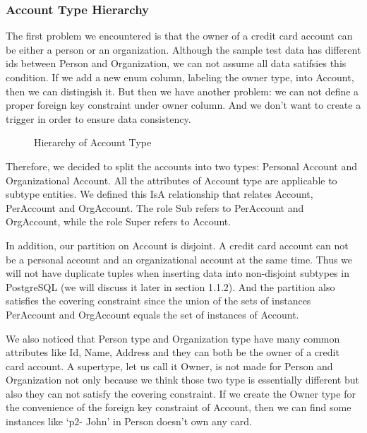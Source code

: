 \documentclass[11pt]{article}
\begin{document}
\subsubsection{Account Type Hierarchy}

\par
The first problem we encountered is that the owner of a credit card account can be either a person or an organization. Although the sample test data has different ids between Person and Organization, we can not assume all data satifsies this condition. If we add a new enum column, labeling the owner type, into Account, then we can distingish it. But then we have another problem: we can not define a proper foreign key constraint under owner column. And we don't want to create a trigger in order to ensure data consistency.

\begin{figure}
\caption{Hierarchy of Account Type}
\end{figure}

\par
Therefore, we decided to split the accounts into two types: Personal Account and Organizational Account. All the attributes of Account type are applicable to subtype entities. We defined this IsA relationship that relates Account, PerAccount and OrgAccount. The role Sub refers to PerAccount and OrgAccount, while the role Super refers to Account.
\par
In addition, our partition on Account is disjoint. A credit card account can not be a personal account and an organizational account at the same time. Thus we will not have duplicate tuples when inserting data into non-disjoint subtypes in PostgreSQL (we will discuss it later in section 1.1.2). And the partition also satisfies the covering constraint since the union of the sets of instances PerAccount and OrgAccount equals the set of instances of Account.
\par
We also noticed that Person type and Organization type have many common attributes like Id, Name, Address and they can both be the owner of a credit card account. A supertype, let us call it Owner, is not made for Person and Organization not only because we think those two type is essentially different but also they can not satisfy the covering constraint. If we create the Owner type for the convenience of the foreign key constraint of Account, then we can find some instances like `p2- John' in Person doesn't own any card.
\par
\end{document}
